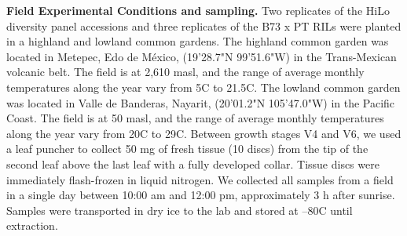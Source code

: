 \documentclass[9pt,twocolumn,twoside,lineno]{biorxiv}
\begin{document}
\textbf{Field Experimental Conditions and sampling.} 
Two replicates of the HiLo diversity panel accessions and three replicates of the B73 x PT RILs were planted in a highland and lowland common gardens. 
The highland common garden was located in Metepec, Edo de M\'exico, (19'28.7"N 99'51.6"W) in the Trans-Mexican volcanic belt. 
The field is at 2,610 masl, and the range of average monthly temperatures along the year vary from 5\degree C to 21.5\degree C.  
The lowland common garden was located in Valle de Banderas, Nayarit, (20'01.2"N 105'47.0"W) in the Pacific Coast. 
The field is at 50 masl, and the range of average monthly temperatures along the year vary from 20\degree C to 29\degree C.
Between growth stages V4 and V6, we used a leaf puncher to collect 50 mg of fresh tissue (10 discs) from the tip of the second leaf above the last leaf with a fully developed collar. 
Tissue discs were immediately flash-frozen in liquid nitrogen. 
We collected all samples from a field in a single day between 10:00 am and 12:00 pm, approximately 3 h after sunrise.
Samples were transported in dry ice to the lab and stored at --80\degree C until extraction. 
\end{document}
